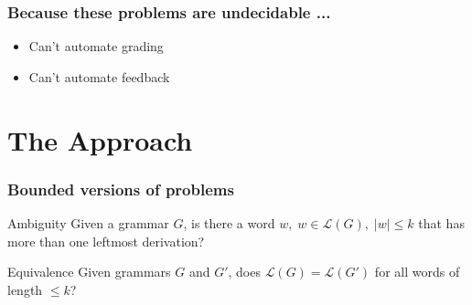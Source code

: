 \documentclass{beamer}
\begin{document}
\begin{frame}
\frametitle{Because these problems are undecidable ...}
\begin{itemize}
\item Can't automate grading
\vspace{0.1in}
\item Can't automate feedback
\end{itemize}
\end{frame}

\section{The Approach}

\begin{frame}
\frametitle {Bounded versions of problems}

\begin{block}{Ambiguity}
Given a grammar $G$, is there a word $w, \; w \in \mathcal{L}(G) , \; |w| \leq k$ that has more than one leftmost derivation?
\end{block}

\vspace{0.2in}

\begin{block}{Equivalence}
Given grammars $G$ and $G'$, does $\mathcal{L}(G) = \mathcal{L}(G')$ for all words of length $\leq k$? 
\end{block}

\end{frame}
\end{document}

